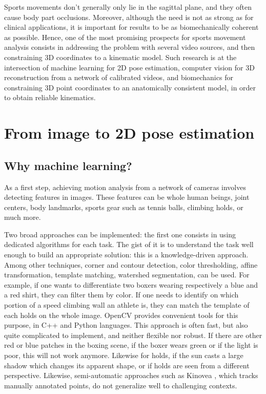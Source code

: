 Sports movements don’t generally only lie in the sagittal plane, and they often cause body part occlusions. Moreover, although the need is not as strong as for clinical applications, it is important for results to be as biomechanically coherent as possible. Hence, one of the most promising prospects for sports movement analysis consists in addressing the problem with several video sources, and then constraining 3D coordinates to a kinematic model.  Such research is at the intersection of machine learning for 2D pose estimation, computer vision for 3D reconstruction from a network of calibrated videos, and biomechanics for constraining 3D point coordinates to an anatomically consistent model, in order to obtain reliable kinematics. 


\section{From image to 2D pose estimation}

\subsection{Why machine learning?}

As a first step, achieving motion analysis from a network of cameras involves detecting features in images. These features can be whole human beings, joint centers, body landmarks, sports gear such as tennis balls, climbing holds, or much more. 

Two broad approaches can be implemented: the first one consists in using dedicated algorithms for each task. The gist of it is to understand the task well enough to build an appropriate solution: this is a knowledge-driven approach. Among other techniques, corner and contour detection, color thresholding, affine transformation, template matching, watershed segmentation, can be used. For example, if one wants to differentiate two boxers wearing respectively a blue and a red shirt, they can filter them by color. If one needs to identify on which portion of a speed climbing wall an athlete is, they can match the template of each holds on the whole image. OpenCV \cite{Bradski2000} provides convenient tools for this purpose, in C++ and Python languages. This approach is often fast, but also quite complicated to implement, and neither flexible nor robust. If there are other red or blue patches in the boxing scene, if the boxer wears green or if the light is poor, this will not work anymore. Likewise for holds, if the sun casts a large shadow which changes its apparent shape, or if holds are seen from a different perspective. Likewise, semi-automatic approaches such as Kinovea \cite{Kinovea}, which tracks manually annotated points, do not generalize well to challenging contexts.

